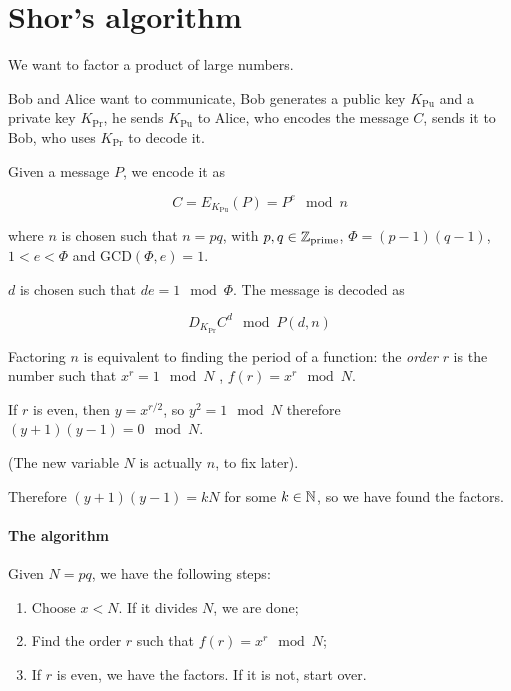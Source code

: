 \section{Shor's algorithm}

We want to factor a product of large numbers.

Bob and Alice want to communicate, Bob generates a public key \( K _{\text{Pu}} \) and a private key \( K _{\text{Pr}}  \), he sends \( K _{\text{Pu}} \) to Alice, who encodes the message \( C \), sends it to Bob, who uses \( K _{\text{Pr}} \) to decode it.

Given a message \( P \), we encode it as

\begin{equation}
  C = E _{K _{\text{Pu}} } (P) = P ^e \mod n
\end{equation}

where \( n \) is chosen such that \( n = pq \), with \( p, q \in \mathbb{Z}_{\text{prime}} \), \(\Phi = (p-1) (q-1)\), \( 1<e<\Phi \) and \( \text{GCD}(\Phi, e) = 1 \).

\( d \) is chosen such that \( de = 1 \mod \Phi \).
The message is decoded as

\begin{equation}
  D _{K _{\text{Pr}}} C^d \mod P (d, n)
\end{equation}

Factoring \( n \) is equivalent to finding the period of a function: the \emph{order} \( r \) is the number such that \( x ^{r} = 1 \mod N  \) , \( f(r) = x^r \mod N \).

If \( r \) is even, then \( y = x ^{r/2}  \), so \( y^2 = 1 \mod N \) therefore \( (y+1)(y-1) = 0 \mod N \).

(The new variable \( N \)  is actually \( n \), to fix later).

Therefore \( (y+1)(y-1) = kN \) for some \( k \in \mathbb{N} \), so we have found the factors.

\paragraph{The algorithm}

Given \( N = pq \), we have the following steps:

\begin{enumerate}
  \item Choose \( x<N \). If it divides \( N \), we are done;
  \item Find the order \( r \) such that \( f(r) = x^r \mod N \); \label{item:qft}
  \item If \( r \) is even, we have the factors. If it is not, start over.
\end{enumerate}

